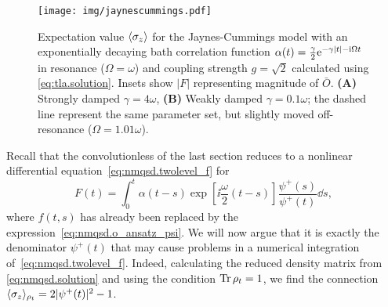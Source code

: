 \begin{figure}
  \centering
  \texttt{[image: img/jaynescummings.pdf]}
  \caption{%
    Expectation value $\langle \sigma_z \rangle$ for the Jaynes-Cummings model with an exponentially decaying bath correlation function $\alpha(t) = \frac{\gamma}{2} \exp[-\gamma\abs{t} - \ii\Omega t]$ in resonance ($\Omega = \omega$) and coupling strength $g = \sqrt{2}$ calculated using \autoref{eq:tla.solution}.
    Insets show $\vert F \vert$ representing magnitude of $\bar O$.
    \textbf{(A)} Strongly damped $\gamma = 4\omega$,
    \textbf{(B)} Weakly damped $\gamma = 0.1\omega$; the dashed line represent the same parameter set, but slightly moved off-resonance ($\Omega = 1.01\omega$).
  }
  \label{fig:nmqsd.jaynes_cummings}
\end{figure}


Recall that the convolutionless \NMSSE of the last section reduces to a nonlinear differential equation~\ref{eq:nmqsd.twolevel_f} for
\begin{equation}
  F(t) = \int_0^t \alpha(t - s) \exp[\ii \frac{\omega}{2} (t - s)] \frac{\psi^+(s)}{\psi^+(t)} \dd s,
  \label{eq:nmqsd.twolevel_f_integral}
\end{equation}
where $f(t, s)$ has already been replaced by the expression~\ref{eq:nmqsd.o_ansatz_psi}.
We will now argue that it is exactly the denominator $\psi^+(t)$ that may cause problems in a numerical integration of~\ref{eq:nmqsd.twolevel_f}.
Indeed, calculating the reduced density matrix from \autoref{eq:nmqsd.solution} and using the condition $\operatorname{Tr} \rho_t = 1$, we find the connection $\langle \sigma_z \rangle_{\rho_t} = 2\vert \psi^+(t) \vert^2 - 1$.

%

